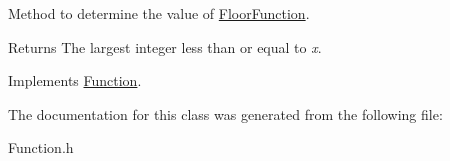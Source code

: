 Method to determine the value of \hyperlink{class_floor_function}{Floor\+Function}. 

\begin{DoxyReturn}{Returns}
The largest integer less than or equal to {\itshape x}. 
\end{DoxyReturn}


Implements \hyperlink{class_function_a7773feae8f1def0a2d7e479363700816}{Function}.



The documentation for this class was generated from the following file\+:\begin{DoxyCompactItemize}
\item 
Function.\+h\end{DoxyCompactItemize}
